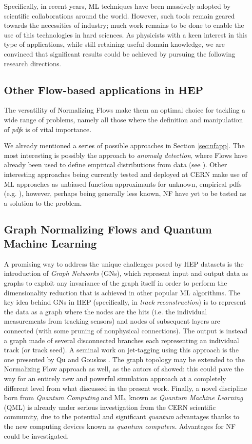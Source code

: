 Specifically, in recent years, ML techniques have been massively adopted by scientific collaborations around the world. However, such tools remain geared towards the necessities of industry; much work remains to be done to enable the use of this technologies in hard sciences. As physicists with a keen interest in this type of applications, while still retaining useful domain knowledge, we are convinced that significant results could be achieved by pursuing the following research directions. 

\subsection{Other Flow-based applications in HEP}

The versatility of Normalizing Flows make them an optimal choice for tackling a wide range of problems, namely all those where the definition and manipulation of \emph{pdf}s is of vital importance.

We already mentioned a series of possible approaches in Section \ref{sec:nfapp}. The most interesting is possibly the approach to \emph{anomaly detection}, where Flows have already been used to define empirical distributions from data (see \cite{Kasieczka_2021}). Other interesting approaches being currently tested and deployed at CERN make use of ML approaches as unbiased function approximants for unknown, empirical pdfs (e.g. \cite{D_Agnolo_2019}), however, perhaps being generally less known, NF have yet to be tested as a solution to the problem.

\subsection{Graph Normalizing Flows and Quantum Machine Learning}

A promising way to address the unique challenges posed by HEP datasets is the introduction of \emph{Graph Networks} (GNs), which represent input and output data as graphs to exploit any invariance of the graph itself in order to perform the dimensionality reduction that is achieved in other popular ML algorithms. 
The key idea behind GNs in HEP (specifically, in \emph{track reconstruction}) is to represent the data as a graph where the nodes are the hits (i.e. the individual measurements from tracking sensors) and nodes of subsequent layers are connected (with some pruning of nonphysical connections). The output is instead a graph made of several disconnected branches each representing an
individual track (or track seed). A seminal work on jet-tagging using this approach is the one presented by Qu and Gouskos \cite{pj2020}. The graph topology may be extended to the Normalizing Flow approach as well, as the autors of \cite{https://doi.org/10.48550/arxiv.2105.09016} showed: this could pave the way for an entirely new and powerful simulation approach at a completely different level from what discussed in the present work.
Finally, a novel discipline born from \emph{Quantum Computing} and ML, known as \emph{Quantum Machine Learning} (QML) is already under serious investigation from the CERN scientific community, due to the potential and significant \emph{quantum} advantages thanks to the new computing devices known as \emph{quantum computer}s. 
Advantages for NF could be investigated.